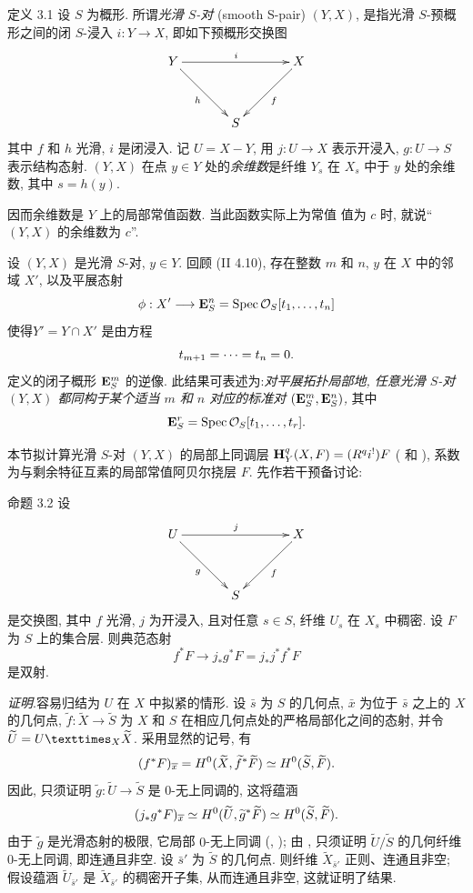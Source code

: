 \begin{enonce*}{定义 3.1}
设 $S$ 为概形. 所谓\emph{光滑 $S$-对} (smooth S-pair) $(Y,X)$, 是指光滑 $S$-预概形之间的闭 $S$-浸入 $i:Y\rightarrow X$, 即如下预概形交换图
$$
\xymatrix@=1.25cm{
Y \ar[rr]^{i} \ar[rd]_{h}&     &X\ar[ld]^{f}\\
  & S   &
}
$$
其中 $f$ 和 $h$ 光滑, $i$ 是闭浸入. 记 $U=X-Y$, 用 $j:U\rightarrow X$ 表示开浸入, $g:U\rightarrow S$ 表示结构态射. $(Y,X)$ 在点 $y\in Y$ 处的\emph{余维数}是纤维 $Y_s$ 在 $X_s$ 中于 $y$ 处的余维数, 其中 $s=h(y)$.
\end{enonce*}

因而余维数是 $Y$ 上的局部常值函数. 当此函数实际上为常值\sisi{,}{,} 值为 $c$ 时, 就说“$(Y,X)$ 的余维数为 $c$”.

设 $(Y,X)$ 是光滑 $S$-对, $y\in Y$. 回顾 (\SGA II 4.10), 存在整数 $m$ 和 $n$, $y$ 在 $X$ 中的邻域 $X'$, 以及平展态射
$$
\phi:X'\longrightarrow \mathbf{E}^n_S=\operatorname{Spec} {\mathcal O}_S[t_1,\dots,t_n]
$$
使得\pageoriginale $Y'=Y\cap X'$ 是由方程
$$
t_{m+1}=\dots=t_n=0{}.
$$
定义的闭子概形 $\mathbf{E}^m_S$ 的逆像. 此结果可表述为:\emph{对平展拓扑局部地, 任意光滑 $S$-对 $(Y,X)$ 都同构于某个适当 $m$ 和 $n$ 对应的标准对 $(\mathbf{E}^m_S, \mathbf{E}^n_S)$,} 其中
$$
\mathbf{E}^r_S=\operatorname{Spec} {\mathcal O}_S[t_1,\dots,t_r]{}.
$$

本节拟计算光滑 $S$-对 $(Y,X)$ 的局部上同调层 $\mathbf{H}^q_Y(X,F)=(R^{q}i^{!})F$ ( 和 ), 系数为与剩余特征互素的局部常值阿贝尔挠层 $F$. 先作若干预备讨论:

\begin{enonce*}{命题 3.2}
设
$$
\xymatrix@=1.25cm{
U \ar[rr]^{j} \ar[rd]_{g}&     &X\ar[ld]^{f}\\
  & S   &
}
$$
是交换图, 其中 $f$ 光滑, $j$ 为开浸入, 且对任意 $s\in S$, 纤维 $U_s$ 在 $X_s$ 中稠密. 设 $F$ 为 $S$ 上的集合层. 则典范态射
$$
f^{\ast}F\longrightarrow j_{\ast}g^{\ast}F=j_{\ast}j^{\ast}f^{\ast}F
$$
是双射.
\end{enonce*}

\noindent
\emph{证明}.\pageoriginale 容易归结为 $U$ 在 $X$ 中拟紧的情形. 设 $\bar{s}$ 为 $S$ 的几何点, $\bar{x}$ 为位于 $\bar{s}$ 之上的 $X$ 的几何点, $\widetilde{f}:\widetilde{X}\rightarrow \widetilde{S}$ 为 $X$ 和 $S$ 在相应几何点处的严格局部化之间的态射, 并令 $\widetilde{U}=\fprod{U}{\widetilde{X}}{X}$. 采用显然的记号, 有
$$
(f^{\ast}F)_{\overline{x}}=H^{0}(\widetilde{X},\widetilde{f}^{\ast}\widetilde{F})\simeq
H^{0}(\widetilde{S},\widetilde{F}){}.
$$
因此, 只须证明 $\widetilde{g}:\widetilde{U}\rightarrow \widetilde{S}$ 是 $0$-无上同调的, 这将蕴涵
$$
(j_{\ast}g^{\ast}F)_{\overline{x}}\simeq
H^{0}(\widetilde{U},\widetilde{g}^{\ast}\widetilde{F})\simeq
H^{0}(\widetilde{S},\widetilde{F}){}.
$$
由于 $\widetilde{g}$ 是光滑态射的极限, 它局部 $0$-无上同调 (, ); 由 , 只须证明 $\widetilde{U}/\widetilde{S}$ 的几何纤维 $0$-无上同调, 即连通且非空. 设 $\bar{s}'$ 为 $\widetilde{S}$ 的几何点. 则纤维 $\widetilde{X}_{\bar{s}'}$ 正则、连通且非空; 假设蕴涵 $\widetilde{U}_{\bar{s}'}$ 是 $\widetilde{X}_{\bar{s}'}$ 的稠密开子集, 从而连通且非空, 这就证明了结果.

